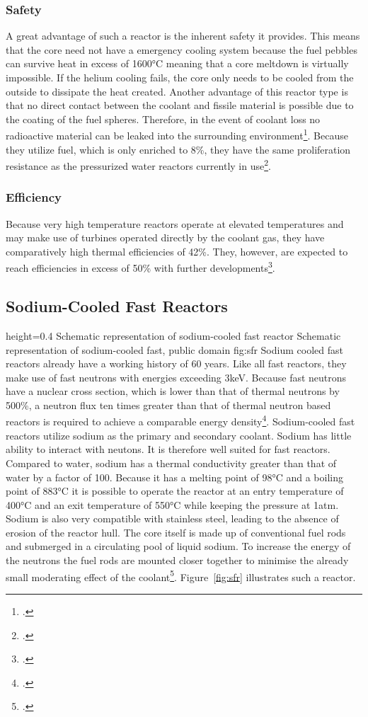 \subsubsection{Safety}
A great advantage of such a reactor is the inherent safety it provides. This means that the core
need not have a emergency cooling system because the fuel pebbles can survive heat in excess of 1600°C
meaning that a core meltdown is virtually impossible. If the helium cooling fails, the core only needs to
be cooled from the outside to dissipate the heat created. Another advantage of this reactor type is that
no direct contact between the coolant and fissile material is possible due to the coating of the fuel
spheres. Therefore, in the event of coolant loss no radioactive material can be leaked
into the surrounding environment\footcite[18-21]{VHTRTS}.
Because they utilize fuel, which is only enriched to 8\%, they have the same proliferation resistance
as the pressurized water reactors currently in use\footcite{VHTRTS}.
\subsubsection{Efficiency}
Because very high temperature reactors operate at elevated temperatures and may make use of turbines
operated directly by the coolant gas, they have comparatively high thermal efficiencies of 42\%.
They, however, are expected to reach efficiencies in excess of 50\% with further developments\footcite[62]{T4Gen}.
\pagebreak
\subsection{Sodium-Cooled Fast Reactors}\label{chap:sfr}
    {height=0.4\textheight}
    {Schematic representation of sodium-cooled fast reactor}
    {Schematic representation of sodium-cooled fast, public domain}
    {fig:sfr}
Sodium cooled fast reactors already have a working history of 60 years. Like all fast reactors, they make
use of fast neutrons with energies exceeding 3keV. Because fast neutrons have a nuclear cross section, which is lower than that
of thermal neutrons by 500\%, a neutron flux ten times greater than that of thermal neutron based reactors
is required to achieve a comparable energy density\footcite[120-122]{ReactorPhysics}.
Sodium-cooled fast reactors utilize sodium as the primary and secondary coolant. Sodium has little
ability to interact with neutons. It is therefore well suited for fast reactors. Compared
to water, sodium has a thermal conductivity greater than that of water by a factor of 100. Because
it has a melting point of 98°C and a boiling point of 883°C it is possible to operate the reactor at an
entry temperature of 400°C and an exit temperature of 550°C while keeping the pressure at 1atm. Sodium
is also very compatible with stainless steel, leading to the absence of erosion of the reactor hull. The core
itself is made up of conventional fuel rods and submerged in a circulating pool of liquid sodium.
To increase the energy of the neutrons the fuel rods are mounted closer together to minimise the
already small moderating effect of the coolant\footcite[94-110]{T4Gen}. Figure~\ref{fig:sfr} illustrates
such a reactor.
